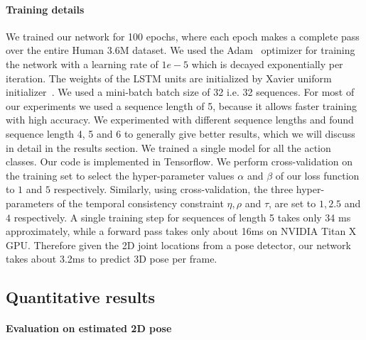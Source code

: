 \documentclass[runningheads]{llncs}
\begin{document}
\paragraph{Training details} 
We trained our network for 100 epochs, where each epoch makes a complete pass over the entire Human 3.6M dataset. We used the Adam~\cite{adam} optimizer for training the network with a learning rate of $1e-5$ which is decayed exponentially per iteration. The weights of the LSTM units are initialized by Xavier uniform initializer~\cite{glorot2010understanding}. We used a mini-batch batch size of 32 i.e. 32 sequences. For most of our experiments we used a sequence length of 5, because it allows faster training with high accuracy. We experimented with different sequence lengths and found sequence length 4, 5 and 6 to generally give better results, which we will discuss in detail in the results section. We trained a single model for all the action classes. Our code is implemented in Tensorflow. We perform cross-validation on the training set to select the hyper-parameter values $\alpha$ and $\beta$ of our loss function to $1$ and $5$ respectively. Similarly, using cross-validation, the three hyper-parameters of the temporal consistency constraint $\eta,\rho$ and $\tau$, are set to $1, 2.5$ and $4$ respectively. A single training step for sequences of length 5 takes only 34 ms approximately, while a forward pass takes only about 16ms on NVIDIA Titan X GPU. Therefore given the 2D joint locations from a pose detector, our network takes about 3.2ms to predict 3D pose per frame.

\subsection{Quantitative results}
\paragraph{Evaluation on estimated 2D pose}
\end{document}

